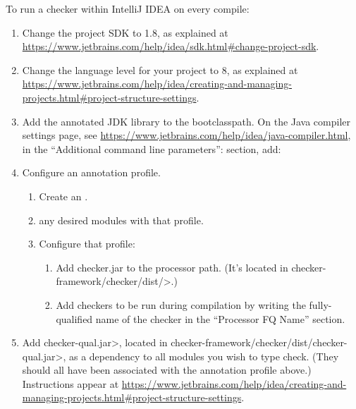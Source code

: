 To run a checker within IntelliJ IDEA on every compile:

\begin{enumerate}

\item Change the project SDK to 1.8, as explained at
  \url{https://www.jetbrains.com/help/idea/sdk.html#change-project-sdk}.

\item Change the language level for your project to 8, as explained at
\url{https://www.jetbrains.com/help/idea/creating-and-managing-projects.html#project-structure-settings}.

\item Add the annotated JDK library to the bootclasspath.
On the Java compiler settings page, see \url{https://www.jetbrains.com/help/idea/java-compiler.html},
in the ``Additional command line parameters'': section, add:\\

\item Configure an annotation profile.
\begin{enumerate}
\item
Create an
.
\item
{}
any desired modules with that profile.
\item
Configure that profile:
\begin{enumerate}
\item  Add checker.jar to the processor path.  (It's located in
  \<checker-framework/checker/dist/>.)
\item  Add checkers to be run during compilation by writing the
  fully-qualified name of the checker in the ``Processor FQ Name''
  section.
\end{enumerate}
\end{enumerate}

\item Add \<checker-qual.jar>, located in
\<checker-framework/checker/dist/checker-qual.jar>,  as a dependency to all
modules you wish to type check. (They should all have been associated with
the annotation profile above.)
Instructions appear at
\url{https://www.jetbrains.com/help/idea/creating-and-managing-projects.html#project-structure-settings}.

\end{enumerate}

